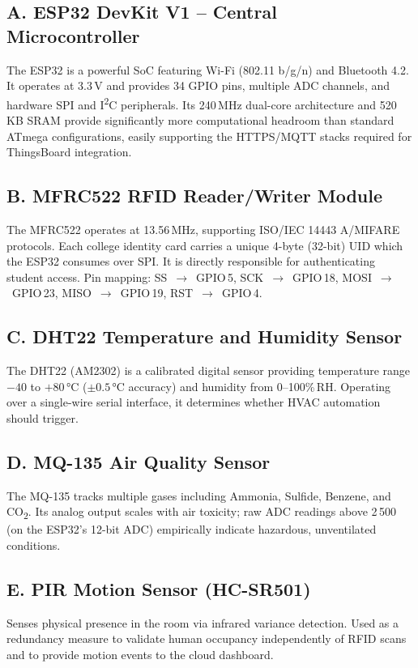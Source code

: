 \documentclass[12pt,a4paper]{article}
\begin{document}
\subsection*{A. ESP32 DevKit V1 -- Central Microcontroller}
The ESP32 is a powerful SoC featuring Wi-Fi (802.11 b/g/n) and Bluetooth 4.2. It
operates at 3.3\,V and provides 34 GPIO pins, multiple ADC channels, and hardware SPI
and I\textsuperscript{2}C peripherals. Its 240\,MHz dual-core architecture and 520\,KB SRAM provide
significantly more computational headroom than standard ATmega configurations, easily
supporting the HTTPS/MQTT stacks required for ThingsBoard integration.

\subsection*{B. MFRC522 RFID Reader/Writer Module}
The MFRC522 operates at 13.56\,MHz, supporting ISO/IEC 14443 A/MIFARE protocols.
Each college identity card carries a unique 4-byte (32-bit) UID which the ESP32
consumes over SPI. It is directly responsible for authenticating student access. Pin
mapping: SS~$\to$~GPIO\,5, SCK~$\to$~GPIO\,18, MOSI~$\to$~GPIO\,23, MISO~$\to$~GPIO\,19,
RST~$\to$~GPIO\,4.

\subsection*{C. DHT22 Temperature and Humidity Sensor}
The DHT22 (AM2302) is a calibrated digital sensor providing temperature range
$-40$ to $+80$\,°C ($\pm0.5$\,°C accuracy) and humidity from 0--100\%\,RH. Operating over a
single-wire serial interface, it determines whether HVAC automation should trigger.

\subsection*{D. MQ-135 Air Quality Sensor}
The MQ-135 tracks multiple gases including Ammonia, Sulfide, Benzene, and CO\textsubscript{2}.
Its analog output scales with air toxicity; raw ADC readings above 2\,500 (on the
ESP32's 12-bit ADC) empirically indicate hazardous, unventilated conditions.

\subsection*{E. PIR Motion Sensor (HC-SR501)}
Senses physical presence in the room via infrared variance detection. Used as a
redundancy measure to validate human occupancy independently of RFID scans and to
provide motion events to the cloud dashboard.
\end{document}
